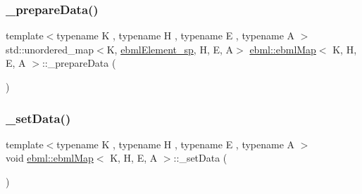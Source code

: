 \mbox{\label{classebml_1_1ebmlMap_a4b1173caaeed4fc75e729a7bae6d3390}} 
\subsubsection{\texorpdfstring{\+\_\+prepare\+Data()}{\_prepareData()}\hspace{0.1cm}{\footnotesize\ttfamily [6/6]}}
{\footnotesize\ttfamily template$<$typename K , typename H , typename E , typename A $>$ \\
std\+::unordered\+\_\+map$<$K, \mbox{\hyperlink{namespaceebml_adad533b7705a16bb360fe56380c5e7be}{ebml\+Element\+\_\+sp}}, H, E, A$>$ \mbox{\hyperlink{classebml_1_1ebmlMap}{ebml\+::ebml\+Map}}$<$ K, H, E, A $>$\+::\+\_\+prepare\+Data (\begin{DoxyParamCaption}\item[{std\+::unordered\+\_\+map$<$ K, \mbox{\hyperlink{namespaceebml_adad533b7705a16bb360fe56380c5e7be}{ebml\+Element\+\_\+sp}}, H, E, A $>$ \&\&}]{ }\end{DoxyParamCaption})\hspace{0.3cm}{\ttfamily [protected]}}

\mbox{\label{classebml_1_1ebmlMap_af49238b045b083e8c47d223ec5eaffd2}} 
\subsubsection{\texorpdfstring{\+\_\+set\+Data()}{\_setData()}\hspace{0.1cm}{\footnotesize\ttfamily [1/4]}}
{\footnotesize\ttfamily template$<$typename K , typename H , typename E , typename A $>$ \\
void \mbox{\hyperlink{classebml_1_1ebmlMap}{ebml\+::ebml\+Map}}$<$ K, H, E, A $>$\+::\+\_\+set\+Data (\begin{DoxyParamCaption}\item[{const std\+::list$<$ \mbox{\hyperlink{namespaceebml_adad533b7705a16bb360fe56380c5e7be}{ebml\+Element\+\_\+sp}} $>$ \&}]{ }\end{DoxyParamCaption})\hspace{0.3cm}{\ttfamily [protected]}}

